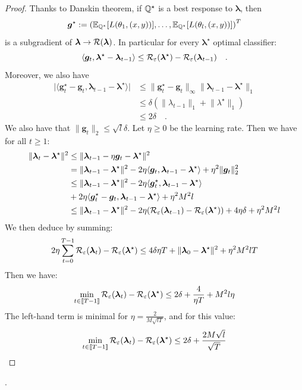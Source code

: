 \begin{proof}
Thanks to Danskin theorem, if $\mathbb{Q}^\star$ is a best response to $\bm{\lambda}$, then $$\bm{g}^\star:=\left(\mathbb{E}_{\QQ^\star}\left[\loss(\theta_1,(x,y))\right],\dots,\mathbb{E}_{\QQ^\star}\left[\loss(\theta_l,(x,y))\right]\right)^T$$ is a subgradient of $\bm{\lambda}\to \mathcal{R}(\bm{\lambda})$. In particular for every $\bm{\lambda}^\star$ optimal classifier:
$$\langle\bm{g}_t,\bm{\lambda}^\star- \bm{\lambda}_{t-1}\rangle\leq \mathcal{R}_\varepsilon(\bm{\lambda}^\star)-\mathcal{R}_\varepsilon(\bm{\lambda}_{t-1})\quad.$$
Moreover, we also have
\begin{align*}
    \lvert\langle\bm{g}^\star_t-\bm{g}_t, \bm{\lambda}_{t-1}-\bm{\lambda}^\star\rangle\vert&\leq \lVert \bm{g}^\star_t-\bm{g}_t\rVert_\infty \lVert \bm{\lambda}_{t-1}-\bm{\lambda}^\star\rVert_1\\
    &\leq \delta\left(\lVert{\lambda}_{t-1}\rVert_1+\lVert{\lambda}^\star\rVert_1\right)\\
    &\leq 2\delta\quad.
\end{align*}
We also have that $\lVert \bm{g}_t\rVert_2\leq \sqrt{l}\delta$.
Let $\eta\geq 0$ be the learning rate. Then we have for all $t\geq 1$:
\begin{align*}
\lVert \bm{\lambda}_t-\bm{\lambda}^\star\rVert^2&\leq \lVert \bm{\lambda}_{t-1}-\eta \bm{g}_t-\bm{\lambda}^\star\rVert^2\\
&=\lVert \bm{\lambda}_{t-1}-\bm{\lambda}^\star\rVert^2-2\eta \langle\bm{g}_t, \bm{\lambda}_{t-1}-\bm{\lambda}^\star\rangle+ \eta^2\lVert \bm{g}_t\rVert^2_2\\
&\leq \lVert \bm{\lambda}_{t-1}-\bm{\lambda}^\star\rVert^2-2\eta \langle\bm{g}^\star_t, \bm{\lambda}_{t-1}-\bm{\lambda}^\star\rangle\\
&+2\eta\langle\bm{g}^\star_t-\bm{g}_t, \bm{\lambda}_{t-1}-\bm{\lambda}^\star\rangle+\eta^2 M^2 l\\
&\leq \lVert \bm{\lambda}_{t-1}-\bm{\lambda}^\star\rVert^2-2\eta\left(\risk_\varepsilon(\bm{\lambda}_{t-1})-\risk_\varepsilon(\bm{\lambda}^\star)\right) +4\eta\delta+\eta^2  M^2 l%
\end{align*}
We then deduce by summing:
\begin{align*}
   2\eta \sum_{t=0}^{T-1} \mathcal{R}_\varepsilon(\bm{\lambda}_t)-\mathcal{R}_\varepsilon(\bm{\lambda}^\star) \leq 4\delta\eta T +\lVert \bm{\lambda}_{0}-\bm{\lambda}^\star\rVert^2+\eta^2 M^2 lT
\end{align*}
Then we have:
\begin{align*}
    \min_{t\in\llbracket T-1\rrbracket }\mathcal{R}_\varepsilon(\bm{\lambda}_t)-\mathcal{R}_\varepsilon(\bm{\lambda}^\star)\leq 2\delta+\frac{4}{\eta T}+M^2l\eta
\end{align*}
The left-hand term is minimal for $\eta=\frac{2}{M\sqrt{lT}}$, and for this value:
\begin{align*}
    \min_{t\in\llbracket T-1\rrbracket}\mathcal{R}_\varepsilon(\bm{\lambda}_t)-\mathcal{R}_\varepsilon(\bm{\lambda}^\star)\leq 2\delta+\frac{2M\sqrt{l}}{\sqrt{T}}
\end{align*}
\end{proof}. 

